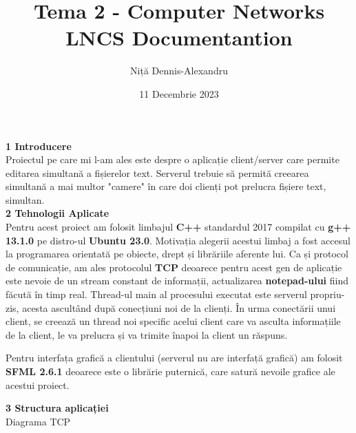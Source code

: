 \documentclass{article}
\title{Tema 2 - Computer Networks LNCS Documentantion}
\author{Niță Dennis-Alexandru}
\date{11 Decembrie 2023}
\begin{document}
\maketitle

{\Large \bf 1 Introducere} 
\\

Proiectul pe care mi l-am ales este despre o aplicație client/server care permite editarea simultană a fișierelor text.
Serverul trebuie să permită creearea simultană a mai multor "camere" în care doi clienți pot prelucra fișiere text, simultan.
\\

{\Large \bf 2 Tehnologii Aplicate} 
\\


Pentru acest proiect am folosit limbajul {\bf C++} standardul 2017 compilat cu {\bf g++ 13.1.0} pe distro-ul {\bf Ubuntu 23.0}. Motivația alegerii acestui limbaj a fost
accesul la programarea orientată pe obiecte, drept și librăriile aferente lui. Ca și protocol de comunicație, am ales protocolul {\bf TCP} deoarece
pentru acest gen de aplicație este nevoie de un stream constant de informații, actualizarea {\bf notepad-ului} fiind făcută în timp real.
Thread-ul main al procesului executat este serverul propriu-zis, acesta ascultând după conecțiuni noi de la clienți. În urma conectării unui client,
se creează un thread noi specific acelui client care va asculta informațiile de la client, le va prelucra și va trimite înapoi la client un răspuns.

Pentru interfața grafică a clientului (serverul nu are interfață grafică) am folosit {\bf SFML 2.6.1} deoarece este o librărie puternică, care satură nevoile grafice ale acestui proiect.
\\

\newpage

{\Large \bf 3 Structura aplicației} 
\\

{\Large Diagrama TCP}
\end{document}
